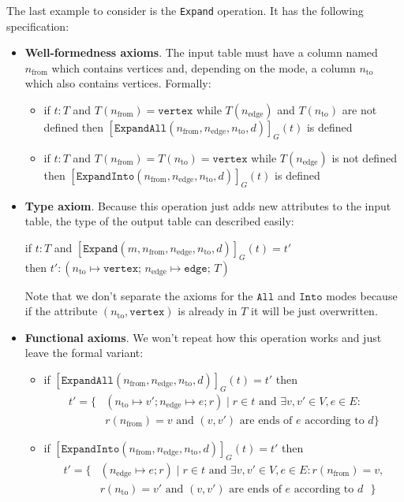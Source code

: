 \documentclass[14pt]{constructor-thesis}
\theoremstyle{definition}
\begin{document}
The last example to consider is the \texttt{Expand} operation. It has the following specification:
\begin{itemize}
  \item \textbf{Well-formedness axioms}. The input table must have a column named $n_{\mathrm{from}}$ which contains vertices and, depending on the mode, a column $n_{\mathrm{to}}$ which also contains vertices. Formally:
  \begin{itemize}
    \item if $t : T$ and $T(n_{\mathrm{from}}) = \texttt{vertex}$ while $T(n_{\mathrm{edge}})$ and $T(n_{\mathrm{to}})$ are not defined
    then $[\texttt{ExpandAll}(n_{\mathrm{from}}, n_{\mathrm{edge}}, n_{\mathrm{to}}, d)]_G(t)$ is defined
    \item if $t : T$ and $T(n_{\mathrm{from}}) = T(n_{\mathrm{to}}) = \texttt{vertex}$ while $T(n_{\mathrm{edge}})$ is not defined
    then $[\texttt{ExpandInto}(n_{\mathrm{from}}, n_{\mathrm{edge}}, n_{\mathrm{to}}, d)]_G(t)$ is defined
  \end{itemize}

  \item \textbf{Type axiom}. Because this operation just adds new attributes to the input table, the type of the output table can described easily:
  \begin{center}
    if $t : T$ and $[\texttt{Expand}(m, n_{\mathrm{from}}, n_{\mathrm{edge}}, n_{\mathrm{to}}, d)]_G(t) = t'$ \\
    then $t' : (n_{\mathrm{to}} \mapsto \texttt{vertex}; \, n_{\mathrm{edge}} \mapsto \texttt{edge}; \, T)$
  \end{center}

  Note that we don't separate the axioms for the $\texttt{All}$ and $\texttt{Into}$ modes because if the attribute $(n_{\mathrm{to}}, \texttt{vertex})$ is already in $T$ it will be just overwritten.

  \item \textbf{Functional axioms}. We won't repeat how this operation works and just leave the formal variant:
  \begin{itemize}
    \item if $[\texttt{ExpandAll}(n_{\mathrm{from}}, n_{\mathrm{edge}}, n_{\mathrm{to}}, d)]_G(t) = t'$ then 
    \begin{align*}
      t' = \{ & (n_{\mathrm{to}} \mapsto v'; n_{\mathrm{edge}} \mapsto e; r) \mid r \in t \text{ and } \exists v, v' \in V, e \in E : \\
      & r(n_{\mathrm{from}}) = v \text{ and $(v, v')$ are ends of $e$ according to $d$} \}
    \end{align*}
    \item if $[\texttt{ExpandInto}(n_{\mathrm{from}}, n_{\mathrm{edge}}, n_{\mathrm{to}}, d)]_G(t) = t'$ then
    \begin{align*}
      t' = \{ & (n_{\mathrm{edge}} \mapsto e; r) \mid r \in t \text{ and } \exists v, v' \in V, e \in E : r(n_{\mathrm{from}}) = v, \\
      & r(n_{\mathrm{to}}) = v' \text{ and $(v, v')$ are ends of $e$ according to $d$ } \}
    \end{align*}
  \end{itemize}
\end{itemize}
\end{document}
